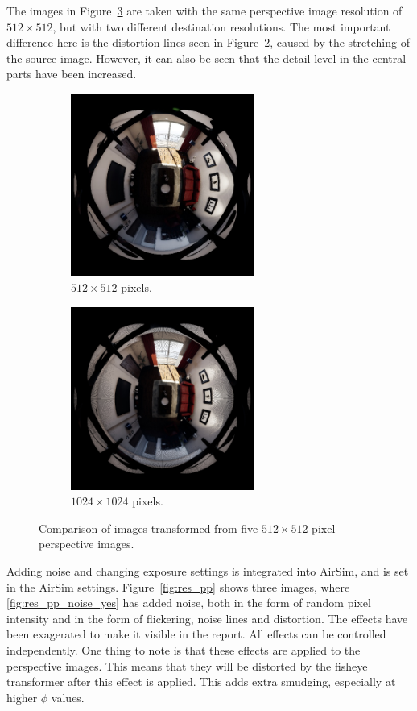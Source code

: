 The images in Figure~\ref{fig:res_comp_equal} are taken with the same perspective image resolution of $512 \times 512$, but with two different destination resolutions. The most important difference here is the distortion lines seen in Figure~\ref{fig:res_comp_equal_512_1024}, caused by the stretching of the source image. However, it can also be seen that the detail level in the central parts have been increased.

\begin{figure}[!htb]
    \centering
    \begin{subfigure}{0.45\textwidth}
        \centering
        \includegraphics[height=6cm]{rapport/fig/Results/512to512.jpeg}
        \caption{$512 \times 512$ pixels.}
        \label{fig:res_comp_equal_512_512}
    \end{subfigure}
    \begin{subfigure}{0.45\textwidth}
        \centering
        \includegraphics[height=6cm]{rapport/fig/Results/512to1024.jpeg}
        \caption{$1024 \times 1024$ pixels.}
        \label{fig:res_comp_equal_512_1024}
    \end{subfigure}
    \caption{Comparison of images transformed from five $512 \times 512$ pixel perspective images.}
    \label{fig:res_comp_equal}
\end{figure}

Adding noise and changing exposure settings is integrated into AirSim, and is set in the AirSim settings. Figure~\ref{fig:res_pp} shows three images, where \ref{fig:res_pp_noise_yes} has added noise, both in the form of random pixel intensity and in the form of flickering, noise lines and distortion. The effects have been exagerated to make it visible in the report. All effects can be controlled independently. One thing to note is that these effects are applied to the perspective images. This means that they will be distorted by the fisheye transformer after this effect is applied. This adds extra smudging, especially at higher $\phi$ values. 

